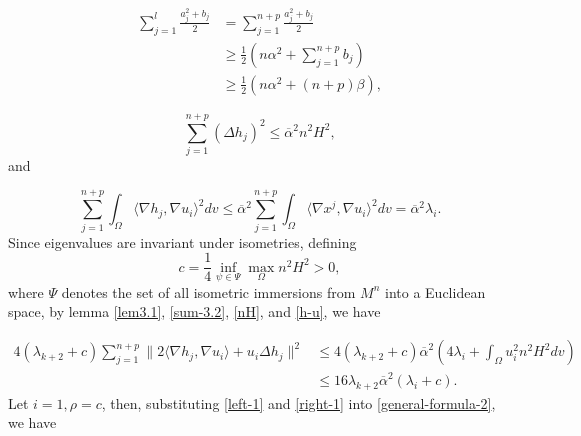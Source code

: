 \documentclass[12pt]{article}
\numberwithin{equation}{section}
\begin{document}
\begin{equation}\begin{aligned}\label{left-1}\sum_{j=1}^{l}\frac{a_{j}^{2}+b_{j}}{2}&=\sum_{j=1}^{n+p}\frac{a_{j}^{2}+b_{j}}{2}\\&\geq\frac{1}{2}\left(n\alpha^{2}+
\sum_{j=1}^{n+p}b_{j}\right)\\&\geq\frac{1}{2}\left(n\alpha^{2}+(n+p)\beta\right),\end{aligned}\end{equation}

\begin{equation}\label{nH}\sum^{n+p}_{j=1}(\Delta h_{j})^{2}\leq\overline{\alpha}^{2}n^{2}H^{2},\end{equation} and

\begin{equation}\label{h-u}\sum_{j=1}^{n+p}\int_{\Omega}\langle\nabla h_{j},\nabla u_{i}\rangle^{2}dv\leq\overline{\alpha}^{2}\sum_{j=1}^{n+p}\int_{\Omega}\langle\nabla x^{j},\nabla u_{i}\rangle^{2}dv=\overline{\alpha}^{2}\lambda_{i}.\end{equation}
Since eigenvalues are invariant under isometries, defining
$$
c=\frac{1}{4}\inf_{\psi\in \Psi}\max_{\Omega}n^{2}H^{2}>0,
$$
where $\Psi$ denotes the set of all isometric immersions from $M^n$
into a Euclidean space, by lemma \ref{lem3.1}, \eqref{sum-3.2}, \eqref{nH}, and \eqref{h-u}, we have


\begin{equation}\begin{aligned}\label{right-1}4(\lambda_{k+2}+c)\sum_{j=1}^{n+p}\|2\langle\nabla h_{j},\nabla u_{i}\rangle
+u_{i}\Delta h_{j}\|^{2}&\leq4(\lambda_{k+2}+c)\overline{\alpha}^{2}\left(4\lambda_{i}+\int_{\Omega}u^{2}_{i}n^{2}H^{2}dv\right)
\\&\leq16\lambda_{k+2}\overline{\alpha}^{2}\left(\lambda_{i}+c\right).\end{aligned}\end{equation}
Let $i=1,\rho=c$, then, substituting  \eqref{left-1} and \eqref{right-1} into \eqref{general-formula-2}, we
have
\end{document}

